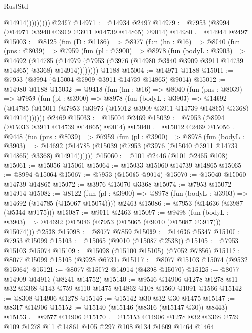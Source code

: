 \begin{lexlean}{RustStd}
\begin{coremodule}
                      @14914)))))))))
    @2497
@14971 := @14934 @2497
@14979 := @7953 (@8994 (@14971 @3940 @3909 @3911 @14739 @14865) @9014)
@14980 := @14944 @2497
@15003 := @8125
    (fun (D : @1186) =>
    @8977
      (fun (hn : @16) =>
      @8040
        (fun (pns : @8039) =>
        @7959
          (fun (pl : @3900) =>
          @8978
            (fun (bodyL : @3903) =>
            @14692
              (@14785
                (@14979 (@7953 (@3976 (@14980 @3940 @3909 @3911 @14739 @14865) @3368) @14914))))))))
    @1188
@15004 := @14971 @1188
@15011 := @7953 (@8994 (@15004 @3909 @3911 @14739 @14865) @9014)
@15012 := @14980 @1188
@15032 := @9418
    (fun (hn : @16) =>
    @8040
      (fun (pns : @8039) =>
      @7959
        (fun (pl : @3900) =>
        @8978
          (fun (bodyL : @3903) =>
          @14692
            (@14785 (@15011 (@7953 (@3976 (@15012 @3909 @3911 @14739 @14865) @3368) @14914)))))))
    @2469
@15033 := @15004 @2469
@15039 := @7953 (@8994 (@15033 @3911 @14739 @14865) @9014)
@15040 := @15012 @2469
@15056 := @9448
    (fun (pns : @8039) =>
    @7959
      (fun (pl : @3900) =>
      @8978
        (fun (bodyL : @3903) =>
        @14692 (@14785 (@15039 (@7953 (@3976 (@15040 @3911 @14739 @14865) @3368) @14914))))))
@15060 := @101 @2446 (@101 @2455 @108)
@15061 := @15056 @15060
@15064 := @15033 @15060 @14739 @14865
@15065 := @8994 @15064
@15067 := @7953 (@15065 @9014)
@15070 := @15040 @15060 @14739 @14865
@15072 := @3976 @15070 @3368
@15074 := @7953 @15072 @14914
@15082 := @8122
    (fun (pl : @3900) => @8978 (fun (bodyL : @3903) => @14692 (@14785 (@15067 @15074))))
    @2463
@15086 := @7953 (@14636 (@3987 (@5344 @9175)))
@15087 := @9011 @2463
@15097 := @9498
    (fun (bodyL : @3903) => @14692 (@15086 (@7953 (@15065 (@9010 (@15087 @3917))) @15074)))
    @2538
@15098 := @8077 @7859
@15099 := @14636 @5347
@15100 := @7953 @15099
@15103 := @15065 (@9010 (@15087 @2538))
@15105 := @7953 @15103 @15074
@15109 := @15098 (@15100 @15105) (@7052 @7856)
@15113 := @8077 @15099 @15105 (@3928 @6731)
@15117 := @8077 @15103 @15074 (@9532 @15064)
@15121 := @8077 @15072 @14914 (@4398 @15070)
@15125 := @8077 @14909 @14913 (@8241 @14752)
@15140 := @9546 @14906 @1278 @1278 @11 @32 @3368 @143 @759 @110 @1475 @14862 @108 @1560 @1091 @1566
@15142 := @8308 @14906 @1278
@15146 := @15142 @30 @32 @30 @1475
@15147 := @8317 @14906
@15152 := @15140 (@15146 (@8316 (@15147 @30)) @8443)
@15153 := @9577 @14906
@15170 := @15153
    @14906
    @1278
    @32
    @3368
    @759
    @109
    @1278
    @11
    @14861
    @105
    @297
    @108
    @134
    @1609
    @1464
    @1464

\end{coremodule}
\end{lexlean}
